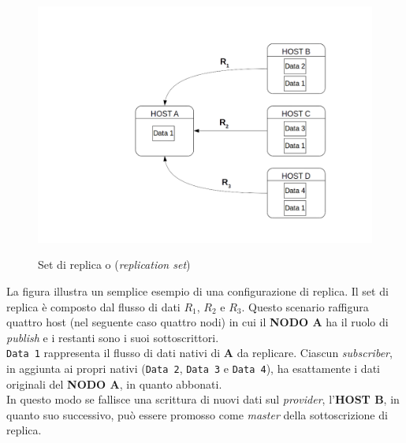\begin{figure}[htbp]
\centering
\includegraphics[scale=0.60]{img/setreplica.png}\\
\caption{Set di replica o (\textit{replication set}) \label{figura1.15}}
\end{figure}
La figura illustra un semplice esempio di una configurazione di replica. Il set di replica \`{e} composto dal flusso di dati $R_1$, $R_2$ e $R_3$.
Questo scenario raffigura quattro host (nel seguente caso quattro nodi) in cui il \textbf{NODO A} ha il ruolo di \textit{publish} e i restanti sono i suoi sottoscrittori.\\
\verb"Data 1" rappresenta il flusso di dati nativi di \textbf{A} da replicare. Ciascun \textit{subscriber}, in aggiunta ai propri nativi (\verb"Data 2", \verb"Data 3" e \verb"Data 4"), ha esattamente i dati originali del \textbf{NODO A}, in quanto abbonati. \\
In questo modo se fallisce una scrittura di nuovi dati sul \textit{provider}, l'\textbf{HOST B}, in quanto suo successivo, pu\`{o} essere promosso come \textit{master} della sottoscrizione di replica.
